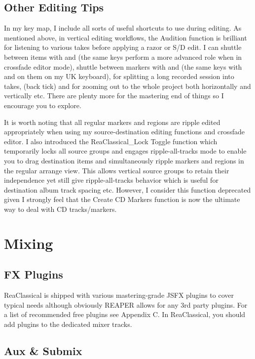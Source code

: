 \documentclass[10pt,american]{article}
\begin{document}
\subsection{Other Editing Tips}

In my key map, I include all sorts of useful shortcuts to use during editing. As
mentioned above, in vertical editing workflows, the Audition function 
is brilliant for listening to various takes before applying a razor or S/D edit.
I can shuttle between items with  and  (the same keys perform a
more advanced role when in crossfade editor mode), shuttle between markers with
\keys{,} and  (the same keys with \keys{<} and \keys{>} on them on my UK
keyboard),  for splitting a long recorded session into takes, 
(back tick) and  for zooming out to the whole project both
horizontally and vertically etc. There are plenty more for the mastering end of
things so I encourage you to explore.

It is worth noting that all regular markers and regions are ripple edited
appropriately when using my source-destination editing functions and crossfade
editor. I also introduced the ReaClassical\_Lock Toggle function  which
temporarily locks all source groups and engages ripple-all-tracks mode to enable
you to drag destination items and simultaneously ripple markers and regions in
the regular arrange view. This allows vertical source groups to retain their
independence yet still give ripple-all-tracks behavior which is useful for
destination album track spacing etc. However, I consider this function
deprecated given I strongly feel that the Create CD Markers function is now the
ultimate way to deal with CD tracks/markers.

\section{Mixing}

\subsection{FX Plugins}

ReaClassical is shipped with various mastering-grade JSFX plugins to cover
typical needs although obviously REAPER allows for any 3rd party plugins. For a
list of recommended free plugins see Appendix C. In ReaClassical, you should add
plugins to the dedicated mixer tracks. 

\subsection{Aux \& Submix}
\end{document}
